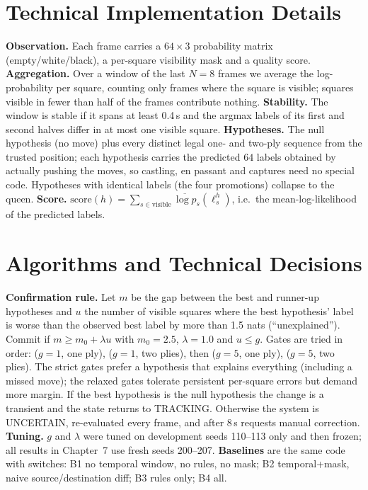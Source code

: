 \section{Technical Implementation Details}
\textbf{Observation.} Each frame carries a $64\times3$ probability matrix (empty/white/black), a per-square
visibility mask and a quality score. \textbf{Aggregation.} Over a window of the last $N=8$ frames we average the
log-probability per square, counting only frames where the square is visible; squares visible in fewer than half of
the frames contribute nothing. \textbf{Stability.} The window is stable if it spans at least 0.4\,s and the
argmax labels of its first and second halves differ in at most one visible square. \textbf{Hypotheses.} The null
hypothesis (no move) plus every distinct legal one- and two-ply sequence from the trusted position; each
hypothesis carries the predicted $64$ labels obtained by actually pushing the moves, so castling, en passant and
captures need no special code. Hypotheses with identical labels (the four promotions) collapse to the queen.
\textbf{Score.} $\mathrm{score}(h)=\sum_{s\in\text{visible}}\overline{\log p}_s(\ell^h_s)$, i.e.\ the mean-log-likelihood
of the predicted labels.

\section{Algorithms and Technical Decisions}
\textbf{Confirmation rule.} Let $m$ be the gap between the best and runner-up hypotheses and $u$ the number of
visible squares where the best hypothesis' label is worse than the observed best label by more than 1.5 nats
(``unexplained''). Commit if $m\geq m_0+\lambda u$ with $m_0=2.5$, $\lambda=1.0$ and $u\le g$. Gates are tried in
order: ($g=1$, one ply), ($g=1$, two plies), then ($g=5$, one ply), ($g=5$, two plies). The strict gates prefer a
hypothesis that explains everything (including a missed move); the relaxed gates tolerate persistent per-square
errors but demand more margin. If the best hypothesis is the null hypothesis the change is a transient and the
state returns to TRACKING. Otherwise the system is UNCERTAIN, re-evaluated every frame, and after 8\,s requests
manual correction. \textbf{Tuning.} $g$ and $\lambda$ were tuned on development seeds 110--113 only and then frozen;
all results in Chapter~7 use fresh seeds 200--207. \textbf{Baselines} are the same code with switches:
B1 no temporal window, no rules, no mask; B2 temporal+mask, naive source/destination diff; B3 rules only; B4 all.

